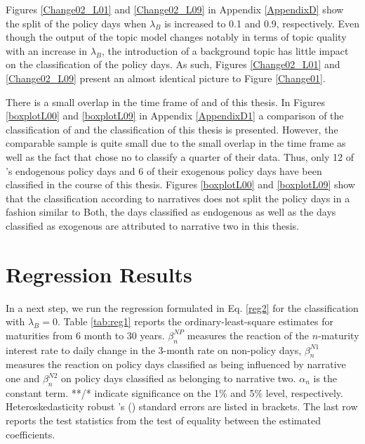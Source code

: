 \documentclass[11pt,a4paper,english,oneside]{book}
\numberwithin{equation}{chapter}
\begin{document}
Figures \ref{Change02_L01} and \ref{Change02_L09} in Appendix \ref{AppendixD} show the split of the policy days when $\lambda_B$ is increased to 0.1 and 0.9, respectively. Even though the output of the topic model changes notably in terms of topic quality with an increase in $\lambda_B$, the introduction of a background topic has little impact on the classification of the policy days. As such, Figures \ref{Change02_L01} and \ref{Change02_L09} present an almost identical picture to Figure \ref{Change01}.

There is a small overlap in the time frame of \cite{Ellingsen.2003} and of this thesis. In Figures \ref{boxplotL00} and \ref{boxplotL09} in Appendix \ref{AppendixD1} a comparison of the classification of \citeauthor{Ellingsen.2003} and the classification of this thesis is presented. However, the comparable sample is quite small due to the small overlap in the time frame as well as the fact that \citeauthor{Ellingsen.2003} chose no to classify a quarter of their data. Thus, only 12 of \citeauthor{Ellingsen.2003}'s endogenous policy days and 6 of their exogenous policy days have been classified in the course of this thesis. Figures \ref{boxplotL00} and \ref{boxplotL09} show that the classification according to narratives does not split the policy days in a fashion similar to \citeauthor{Ellingsen.2003} Both, the days classified as endogenous as well as the days classified as exogenous are attributed to narrative two in this thesis.  
 
\section{Regression Results}\label{Ch:regressionresults}
In a next step, we run the regression formulated in Eq. \ref{reg2} for the  classification with $\lambda_B =0$. Table \ref{tab:reg1} reports the ordinary-least-square estimates for maturities from 6 month to 30 years. $\beta_n^{NP}$ measures the reaction of the $n$-maturity interest rate to daily change in the 3-month rate on non-policy days, $\beta_n^{N1}$ measures the reaction on policy days classified as being influenced by narrative one and $\beta_n^{N2}$ on policy days classified as belonging to narrative two. $\alpha_n$ is the constant term. **/* indicate significance on the 1\% and 5\% level, respectively. Heteroskedasticity robust \citeauthor{White.1980}'s (\citeyear{White.1980}) standard errors are listed in brackets. The last row reports the test statistics from the test of equality between the estimated coefficients.
\end{document}
